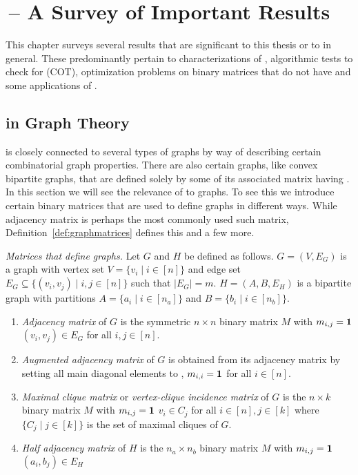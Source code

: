 \chapter{\CoP\,-- A Survey of Important Results}
\label{ch:copsurvey}

This chapter surveys several results that are significant to this
thesis or to \COP in general. These predominantly pertain to
characterizations of \COP, algorithmic tests to check for \COP (COT),
optimization problems on binary matrices that do not have \COP and
some applications of \COP.



\section{\COP in Graph Theory}

\COP is closely connected to several types of graphs by way of
describing certain combinatorial graph properties. There are also
certain graphs, like convex bipartite graphs, that are defined solely
by some of its associated matrix having \COP.  In this section we will
see the relevance of \cop to graphs.  To see this we introduce certain
binary matrices that are used to define graphs in different
ways. While adjacency matrix is perhaps the most commonly used such
matrix, Definition~\ref{def:graphmatrices} defines this and a few
more.

\begin{definition}{\emph{Matrices that define
      graphs.\cite[Def.~2.4]{d08phd}}} %
  \label{def:graphmatrices} %
  Let $G$ and $H$ be defined as follows. $G = (V,E_G)$ is a graph with
  vertex set $V = \{v_i \mid i \in [n]\}$ and edge set $E_G \subseteq
  \{(v_i,v_j) \mid i, j \in [n]\}$ such that $|E_G| = m$. $H = (A, B,
  E_H)$ is a bipartite graph with partitions $A = \{a_i \mid i \in
  [n_a]\}$ and $B = \{b_i \mid i \in [n_b]\}$.
  \begin{enumerate}
  \item \emph{Adjacency matrix} of $G$ is the symmetric $n \times n$
    binary matrix $M$ with $m_{i,j} = \textbf{1}$ \iff $(v_i,v_j) \in E_G$
    for all $i,j \in [n]$.
  \item \emph{Augmented adjacency matrix} of $G$ is obtained from its
    adjacency matrix by setting all main diagonal elements to \un, \ie
    $m_{i,i} = \textbf{1}$ for all $i \in [n]$.
  \item \emph{Maximal clique matrix} or \emph{vertex-clique incidence
      matrix} of $G$ is the $n \times k$ binary matrix $M$ with
    $m_{i,j} = \textbf{1}$ \iff $v_i \in C_j$ for all $i \in [n], j \in [k]$
    where $\{C_j \mid j \in [k]\}$ is the set of maximal cliques of
    $G$.
  \item \emph{Half adjacency matrix} of $H$ is the $n_a \times n_b$
    binary matrix $M$ with $m_{i,j} = \textbf{1}$ \iff $(a_i, b_j) \in E_H$
  \end{enumerate}
\end{definition}

